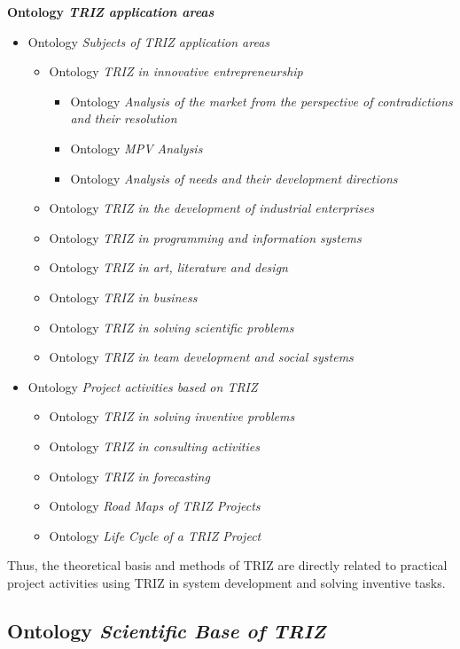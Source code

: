 \documentclass[11pt,a4paper]{article}
\begin{document}
\textbf{Ontology \emph{TRIZ application areas}}
\begin{itemize}
\item Ontology \emph{Subjects of TRIZ application areas}
  \begin{itemize}[noitemsep]
  \item Ontology \emph{TRIZ in innovative entrepreneurship}
    \begin{itemize}[noitemsep]
    \item Ontology \emph{Analysis of the market from the perspective of
      contradictions and their resolution}
    \item Ontology \emph{MPV Analysis}
    \item Ontology \emph{Analysis of needs and their development directions}
    \end{itemize}
  \item Ontology \emph{TRIZ in the development of industrial enterprises}
  \item Ontology \emph{TRIZ in programming and information systems}
  \item Ontology \emph{TRIZ in art, literature and design}
  \item Ontology \emph{TRIZ in business}
  \item Ontology \emph{TRIZ in solving scientific problems}
  \item Ontology \emph{TRIZ in team development and social systems}
  \end{itemize}
\item Ontology \emph{Project activities based on TRIZ}
  \begin{itemize}[noitemsep]
  \item Ontology \emph{TRIZ in solving inventive problems}
  \item Ontology \emph{TRIZ in consulting activities}
  \item Ontology \emph{TRIZ in forecasting}
  \item Ontology \emph{Road Maps of TRIZ Projects}
  \item Ontology \emph{Life Cycle of a TRIZ Project}
  \end{itemize}
\end{itemize}

Thus, the theoretical basis and methods of TRIZ are directly related to
practical project activities using TRIZ in system development and solving
inventive tasks.

\subsection{Ontology \emph{Scientific Base of TRIZ}}
\end{document}
